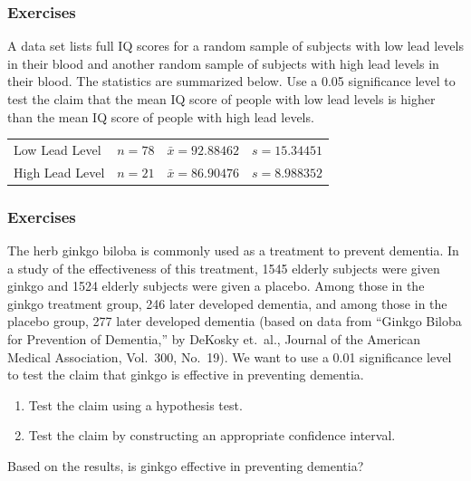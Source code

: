 \documentclass[xcolor=dvipsnames]{beamer}
\begin{document}
\begin{frame}
  \frametitle{Exercises}
 A data set lists full IQ scores for
a random sample of subjects with low lead levels in their blood
and another random sample of subjects with high lead levels in
their blood. The statistics are summarized below. Use a 0.05
significance level to test the claim that the mean IQ score of
people with low lead levels is higher than the mean IQ score of
people with high lead levels.

\medskip

\begin{tabular}{llll}
  Low Lead Level & $n=78$ & $\bar{x}=92.88462$ & $s=15.34451$ \\ 
  High Lead Level & $n=21$ & $\bar{x}=86.90476$ & $s=8.988352$ \\
\end{tabular}
\end{frame}




\begin{frame}
  \frametitle{Exercises}
 The herb ginkgo biloba is commonly used
as a treatment to prevent dementia. In a study of the effectiveness of
this treatment, 1545 elderly subjects were given ginkgo and 1524
elderly subjects were given a placebo. Among those in the ginkgo
treatment group, 246 later developed dementia, and among those in the
placebo group, 277 later developed dementia (based on data from
``Ginkgo Biloba for Prevention of Dementia,'' by DeKosky et.\ al., Journal
of the American Medical Association, Vol.\ 300, No.\ 19). We want to use
a 0.01 significance level to test the claim that ginkgo is effective
in preventing dementia.

\begin{enumerate}
\item Test the claim using a hypothesis test.
\item Test the claim by constructing an appropriate confidence interval.
\end{enumerate}

Based on the results, is ginkgo effective in preventing dementia?
\end{frame}
\end{document}
